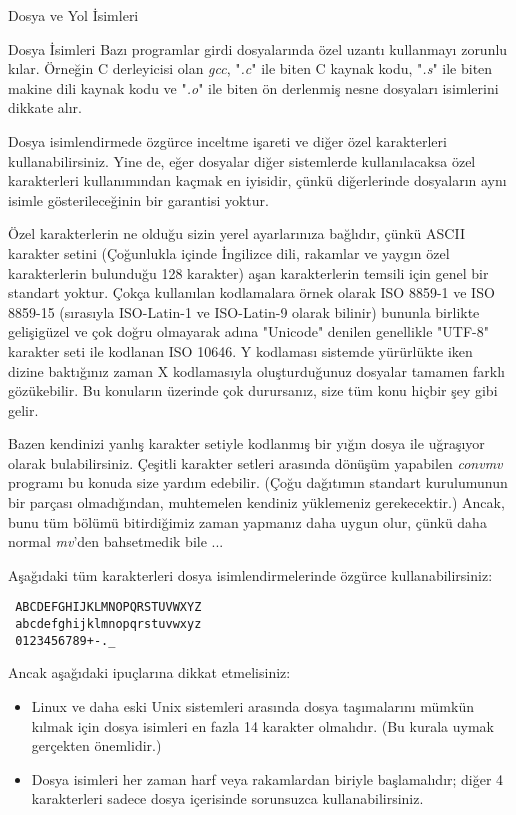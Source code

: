 \begin{section}{Dosya ve Yol İsimleri}
\begin{subsection}{Dosya İsimleri}
	Bazı programlar girdi dosyalarında özel uzantı kullanmayı zorunlu kılar. Örneğin C derleyicisi olan \emph{gcc}, "\emph{.c}" ile biten C kaynak kodu, "\emph{.s}" ile biten makine dili kaynak kodu ve "\emph{.o}" ile biten ön derlenmiş nesne dosyaları isimlerini dikkate alır.
	
	Dosya isimlendirmede özgürce inceltme işareti ve diğer özel karakterleri kullanabilirsiniz. Yine de, eğer dosyalar diğer sistemlerde kullanılacaksa özel karakterleri kullanımından kaçmak en iyisidir, çünkü diğerlerinde dosyaların aynı isimle gösterileceğinin bir garantisi yoktur.
	
	Özel karakterlerin ne olduğu sizin yerel ayarlarınıza bağlıdır, çünkü ASCII karakter setini (Çoğunlukla içinde İngilizce dili, rakamlar ve yaygın özel karakterlerin bulunduğu 128 karakter) aşan karakterlerin temsili için genel bir standart yoktur. Çokça kullanılan kodlamalara örnek olarak ISO 8859-1 ve ISO 8859-15 (sırasıyla ISO-Latin-1 ve ISO-Latin-9 olarak bilinir) bununla birlikte gelişigüzel ve çok doğru olmayarak adına "Unicode" denilen genellikle "UTF-8" karakter seti ile kodlanan ISO 10646. Y kodlaması sistemde yürürlükte iken dizine baktığınız zaman X kodlamasıyla oluşturduğunuz dosyalar tamamen farklı gözükebilir. Bu konuların üzerinde çok durursanız, size tüm konu hiçbir şey gibi gelir.
	
	Bazen kendinizi yanlış karakter setiyle kodlanmış bir yığın dosya ile uğraşıyor olarak bulabilirsiniz. Çeşitli karakter setleri arasında dönüşüm yapabilen \emph{convmv} programı bu konuda size yardım edebilir. (Çoğu dağıtımın standart kurulumunun bir parçası olmadığından, muhtemelen kendiniz yüklemeniz gerekecektir.) Ancak, bunu tüm bölümü bitirdiğimiz zaman yapmanız daha uygun olur, çünkü daha normal \emph{mv}'den bahsetmedik bile ...
	
Aşağıdaki tüm karakterleri dosya isimlendirmelerinde özgürce kullanabilirsiniz:
\begin{verbatim}
 ABCDEFGHIJKLMNOPQRSTUVWXYZ
 abcdefghijklmnopqrstuvwxyz
 0123456789+-._
\end{verbatim}

Ancak aşağıdaki ipuçlarına dikkat etmelisiniz:
\begin{itemize}
\item Linux ve daha eski Unix sistemleri arasında dosya taşımalarını mümkün kılmak için dosya isimleri en fazla 14 karakter olmalıdır. (Bu kurala uymak gerçekten önemlidir.)
\item Dosya isimleri her zaman harf veya rakamlardan biriyle başlamalıdır; diğer 4 karakterleri sadece dosya içerisinde sorunsuzca kullanabilirsiniz.
\end{itemize}


\end{subsection}
\end{section}
